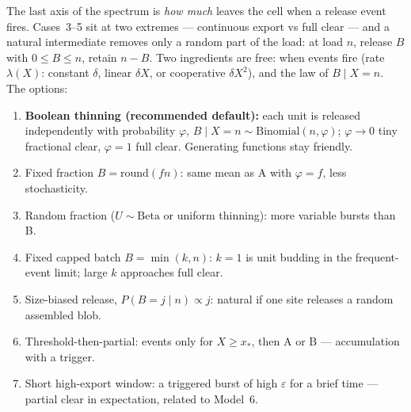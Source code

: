 The last axis of the spectrum is \emph{how much} leaves the cell when a
release event fires. Cases~3--5 sit at two extremes --- continuous export
vs full clear --- and a natural intermediate removes only a random part of
the load: at load $n$, release $B$ with $0\le B\le n$, retain $n-B$. Two
ingredients are free: when events fire (rate $\lambda(X)$: constant
$\delta$, linear $\delta X$, or cooperative $\delta X^2$), and the law of
$B\mid X=n$. The options:
\begin{enumerate}
\item[A.] \textbf{Boolean thinning (recommended default):} each unit is
released independently with probability $\varphi$,
$B\mid X=n\sim\mathrm{Binomial}(n,\varphi)$; $\varphi\to0$ tiny fractional clear,
$\varphi=1$ full clear. Generating functions stay friendly.
\item[B.] Fixed fraction $B=\mathrm{round}(fn)$: same mean as A with
$\varphi=f$, less stochasticity.
\item[C.] Random fraction ($U\sim\mathrm{Beta}$ or uniform thinning): more
variable bursts than B.
\item[D.] Fixed capped batch $B=\min(k,n)$: $k=1$ is unit budding in the
frequent-event limit; large $k$ approaches full clear.
\item[E.] Size-biased release, $P(B=j\mid n)\propto j$: natural if one site
releases a random assembled blob.
\item[F.] Threshold-then-partial: events only for $X\ge x_*$, then A or B
--- accumulation with a trigger.
\item[G.] Short high-export window: a triggered burst of high $\varepsilon$
for a brief time --- partial clear in expectation, related to Model~6.
\end{enumerate}

